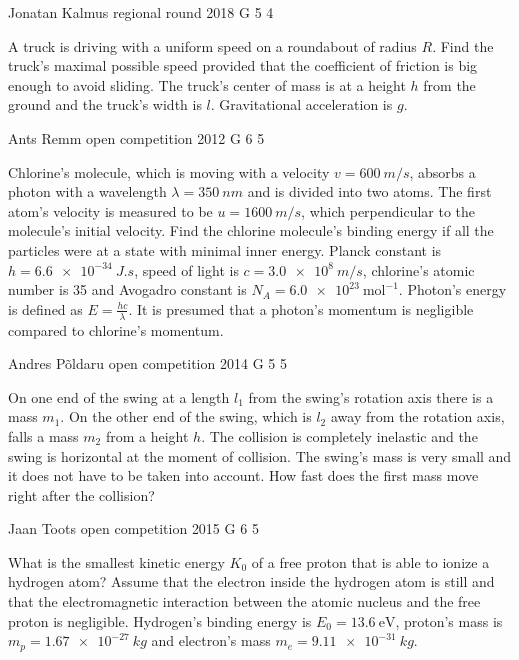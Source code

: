 \documentclass[11pt]{article}
\begin{document}
{Jonatan Kalmus} %
{regional round} %
{2018} %
{G 5} %
{4} %
{

\ifEngStatement
A truck is driving with a uniform speed on a roundabout of radius $R$. Find the truck’s maximal possible speed provided that the coefficient of friction is big enough to avoid sliding. The truck’s center of mass is at a height $h$ from the ground and the truck’s width is $l$. Gravitational acceleration is $g$.
\fi
}

{Ants Remm} %
{open competition} %
{2012} %
{G 6} %
{5} %
{

\ifEngStatement
Chlorine’s molecule, which is moving with a velocity $v = \SI{600}{m/s}$, absorbs a photon with a wavelength $\lambda = \SI{350}{nm}$ and is divided into two atoms. The first atom’s velocity is measured to be $ u = \SI{1600}{m/s}$, which perpendicular to the molecule’s initial velocity. Find the chlorine molecule’s binding energy if all the particles were at a state with minimal inner energy. Planck constant is $h =
\SI{6,6e-34}{J.s}$, speed of light is $c = \SI{3,0e8}{m/s}$, chlorine’s atomic number is 35 and Avogadro constant is $N_A
= \SI{6,0e23}{\text{mol}^{-1}}$. Photon’s energy is defined as $E =
\frac{h c}{\lambda}$. It is presumed that a photon’s momentum is negligible compared to chlorine’s momentum.
\fi
}

{Andres Põldaru} %
{open competition} %
{2014} %
{G 5} %
{5} %
{

\ifEngStatement
On one end of the swing at a length $l_1$ from the swing’s rotation axis there is a mass $m_1$. On the other end of the swing, which is $l_2$ away from the rotation axis, falls a mass $m_2$ from a height $h$. The collision is completely inelastic and the swing is horizontal at the moment of collision. The swing’s mass is very small and it does not have to be taken into account. How fast does the first mass move right after the collision?
\fi
}

{Jaan Toots} %
{open competition} %
{2015} %
{G 6} %
{5} %
{

\ifEngStatement
What is the smallest kinetic energy $K_0$ of a free proton that is able to ionize a hydrogen atom? Assume that the electron inside the hydrogen atom is still and that the electromagnetic interaction between the atomic nucleus and the free proton is negligible. Hydrogen’s binding energy is $E_0 = \SI{13.6}{\electronvolt}$, proton’s mass is $m_p=\SI{1.67e-27}{kg}$ and electron’s mass $m_e=\SI{9.11e-31}{kg}$.
\fi
}
\end{document}

